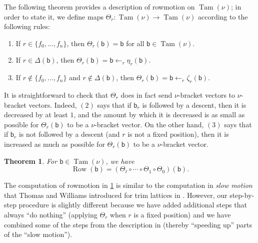 \documentclass[11pt]{amsart}
\newtheorem{theorem}{Theorem}[section]
\theoremstyle{definition}
\DeclareMathOperator{\Tam}{Tam}
\DeclareMathOperator{\row}{Row}
\begin{document}
The following theorem provides a description of rowmotion on $\Tam(\nu)$; in order to state it, we define maps $\Theta_r\colon\Tam(\nu)\to\Tam(\nu)$ according to the following rules: 
\begin{enumerate}
\item If $r\in\{f_0,\ldots,f_n\}$, then $\Theta_r(\mathsf b)=\mathsf b$ for all $\mathsf b\in\Tam(\nu)$.
\item If $r\in\Delta(\mathsf b)$, then $\Theta_r(\mathsf b)=\mathsf b\leftarrow_r\eta_r(\mathsf b)$.
\item If $r\not\in\{f_0,\ldots,f_n\}$ and $r\not\in\Delta(\mathsf{b})$, then $\Theta_r(\mathsf b)=\mathsf b\leftarrow_r\zeta_r(\mathsf b)$.
\end{enumerate}
It is straightforward to check that $\Theta_r$ does in fact send $\nu$-bracket vectors to $\nu$-bracket vectors. Indeed, $(2)$ says that if $\mathsf b_r$ is followed by a descent, then it is decreased by at least $1$, and the amount by which it is decreased is as small as possible for $\Theta_r(\mathsf b)$ to be a $\nu$-bracket vector. On the other hand, $(3)$ says that if $\mathsf b_r$ is not followed by a descent (and $r$ is not a fixed position), then it is increased as much as possible for $\Theta_r(\mathsf b)$ to be a $\nu$-bracket vector. 

\begin{theorem}\label{thm:rowmotionbracket}
For $\mathsf b\in\Tam(\nu)$, we have \[\row(\mathsf b)=(\Theta_\ell\circ\cdots\circ\Theta_1\circ\Theta_0)(\mathsf b).\]
\end{theorem}

The computation of rowmotion in \cref{thm:rowmotionbracket} is similar to the computation in \emph{slow motion} that Thomas and Williams introduced for trim lattices in \cite{ThomasWilliams}. However, our step-by-step procedure is slightly different because we have added additional steps that always ``do nothing'' (applying $\Theta_r$ when $r$ is a fixed position) and we have combined some of the steps from the description in \cite{ThomasWilliams} (thereby ``speeding up'' parts of the ``slow motion''). 
\end{document}
